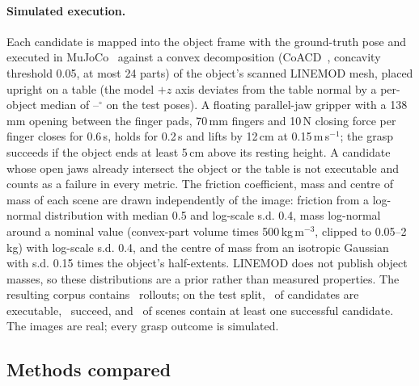 \paragraph{Simulated execution.} Each candidate is mapped into the object frame with the ground-truth pose and executed in MuJoCo~\cite{todorov2012mujoco} against a convex decomposition (CoACD~\cite{wei2022coacd}, concavity threshold 0.05, at most 24 parts) of the object's scanned LINEMOD mesh, placed upright on a table (the model $+z$ axis deviates from the table normal by a per-object median of \UprightDegLo--\UprightDegHi$^\circ$ on the test poses). A floating parallel-jaw gripper with a 138\,mm opening between the finger pads, 70\,mm fingers and 10\,N closing force per finger closes for 0.6\,s, holds for 0.2\,s and lifts by 12\,cm at 0.15\,m\,s$^{-1}$; the grasp succeeds if the object ends at least 5\,cm above its resting height. A candidate whose open jaws already intersect the object or the table is not executable and counts as a failure in every metric. The friction coefficient, mass and centre of mass of each scene are drawn independently of the image: friction from a log-normal distribution with median 0.5 and log-scale s.d. 0.4, mass log-normal around a nominal value (convex-part volume times 500\,kg\,m$^{-3}$, clipped to 0.05--2\,kg) with log-scale s.d. 0.4, and the centre of mass from an isotropic Gaussian with s.d. 0.15 times the object's half-extents. LINEMOD does not publish object masses, so these distributions are a prior rather than measured properties. The resulting corpus contains \NRollouts\ rollouts; on the test split, \TestExec\ of candidates are executable, \TestBase\ succeed, and \TestOracle\ of scenes contain at least one successful candidate. The images are real; every grasp outcome is simulated.

\subsection{Methods compared}
